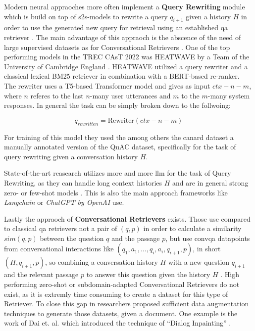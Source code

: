Modern neural appraoches more often implement a \textbf{Query Rewriting} module which is build on top of \gls{s2s}-models to rewrite a query $q_{i+1}$ given a history $H$ in order to use the generated new query for retrieval using an established \gls{qa} retriever \cite{owoicho_trec_2022}. The main advantage of this appraoch is the abscence of the need of large supervised datasets as for Conversational Retrievers \cite{dai_dialog_2022}. One of the top performing models in the TREC CAsT 2022 was HEATWAVE by a Team of the University of Cambridge England \cite{liusie_university_nodate}. HEATWAVE utilized a query rewriter and a classical lexical BM25 retriever in combination with a BERT-based re-ranker. The rewriter uses a T5-based Transformer model and gives as input $ctx-n-m$, where $n$ referes to the last $n$-many user utterances and $m$ to the $m$-many system responses. In general the task can be simply broken down to the follwoing:

\begin{equation}
    q_{rewritten} = \text{Rewriter}(ctx-n-m)
\end{equation}

For training of this model they used the among others the canard dataset \cite{elgohary_can_2019} a manually annotated version of the QuAC dataset, specifically for the task of query rewriting given a conversation history $H$.

State-of-the-art reasearch utilizes more and more \gls{llm} for the task of Query Rewriting, as they can handle long context histories $H$ and are in general strong zero- or few-shot models \cite{mao_large_2023}. This is also the main approach frameworks like \textit{Langchain} \cite{noauthor_question_nodate} or \textit{ChatGPT by OpenAI} \cite{noauthor_chatgpt_2023} use. 


Lastly the appraoch of \textbf{Conversational Retrievers} exists. Those use compared to classical \gls{qa} retrievers not a pair of $(q,p)$ in order to calculate a similarity $sim(q,p)$ between the question $q$ and the passage $p$, but use \gls{convqa} datapoints from conversational interactions like $(q_1, a_1, \dots, q_i, a_i, q_{i+1}, p)$, in short $(H, q_{i+1}, p)$, so combining a conversation history $H$ with a new question $q_{i+1}$ and the relevant passage $p$ to answer this question given the history $H$ \cite{gao_neural_2022,dai_dialog_2022}. High performing zero-shot or subdomain-adapted Conversational Retrievers do not exist, as it is extremly time consuming to create a dataset for this type of Retriever. To close this gap in researchers proposed sufficient data augmentation techniques to generate those datasets, given a document. One example is the work of Dai et. al. \cite{dai_dialog_2022} which introduced the technique of \enquote{Dialog Inpainting} \cite{dai_dialog_2022}.  

